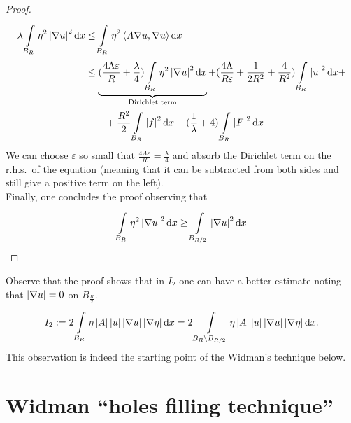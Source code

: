 \begin{proof}
	\begin{align}
		\lambda \int\limits_{B_{R}}^{} \eta^{2}\abs{\nabla u}^{2} \dd{x}
		 & \leq \int\limits_{B_{R}}^{} \eta^{2} \left\langle A \nabla u, \nabla u \right\rangle \dd{x}  \\
		 & \leq  \underbrace{(\frac{4 \Lambda \varepsilon}{R}+ \frac{\lambda}{4}) \int\limits_{B_{R}}^{} \eta^{2}\abs{\nabla u}^{2} \dd{x}}_{\text{Dirichlet term}} + (\frac{4 \Lambda}{R \varepsilon}+\frac{1}{2 R^{2}}+\frac{4}{R^{2}}) \int\limits_{B_{R}}^{} \abs{u}^{2} \dd{x} +  \\
		 & \qquad + \frac{R^{2}}{2} \int\limits_{B_{R}}^{} \abs{f}^{2} \dd{x} + (\frac{1}{\lambda}+4) \int\limits_{B_{R}}^{} \abs{F}^{2} \dd{x}
	\end{align}
	We can choose \(\varepsilon \) so small that \(\frac{4 \Lambda \varepsilon}{R} = \frac{\lambda}{4}\) and absorb the Dirichlet term on the r.h.s.\ of the equation (meaning that it can be subtracted from both sides and still give a positive term on the left).\\
	Finally, one concludes the proof observing that
	\begin{gather}
		\int\limits_{B_{R}}^{} \eta^{2}\abs{\nabla u}^{2} \dd{x} \geq \int\limits_{B_{\frac{R}{2}}}^{} \abs{\nabla u}^{2} \dd{x}
	\end{gather}
\end{proof}
Observe that the proof shows that in \(I_{2}\) one can have a better estimate noting that \(\left\lvert\nabla u\right\rvert=0\) on \(B_{\frac{R}{2}}\).
\begin{gather}
	I_{2}:= 2 \int\limits_{B_{R}}^{} \eta \abs{A} \abs{u}\abs{\nabla u}\abs{\nabla \eta} \dd{x} = 2 \int\limits_{B_{R}\setminus B_{\frac{R}{2}}}^{} \eta \abs{A}\abs{u}\abs{\nabla u}\abs{\nabla \eta} \dd{x}.
\end{gather}
This observation is indeed the starting point of the Widman's technique below.

\section{Widman ``holes filling technique''}

